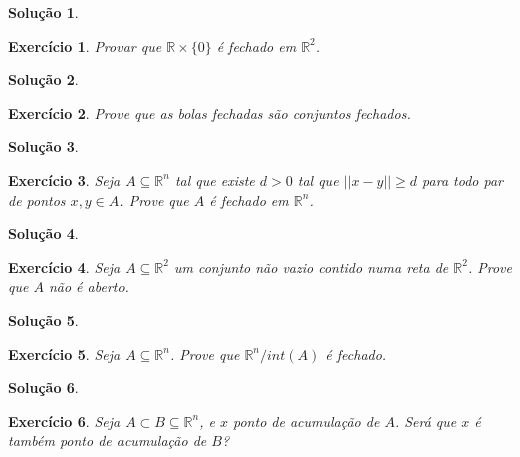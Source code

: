 \documentclass[a4paper,12pt]{article}
\newcommand{\R}{\mathbb{R}}
\theoremstyle{exer}
\newtheorem{exercise}{Exercício}
\theoremstyle{definition}
\newtheorem{solution}{Solução}
\theoremstyle{plain}
\begin{document}
\begin{solution}
 
\end{solution}

\begin{exercise}
    Provar que $\R \times \{0\}$ é fechado em $\R^2$.
\end{exercise}

\begin{solution}

\end{solution}

\begin{exercise}
    Prove que as bolas fechadas são conjuntos fechados.
\end{exercise}

\begin{solution}

\end{solution}

\begin{exercise}
    Seja $A \subseteq \R^n$ tal que existe $d > 0$ tal que $||x - y|| \ge d$
    para todo par de pontos $x, y \in A$. Prove que $A$ é fechado em $\R^n$.
\end{exercise}

\begin{solution}
  
\end{solution}

\begin{exercise}
    Seja $A \subseteq \R^2$ um conjunto não vazio contido numa reta de $\R^2$. Prove que $A$ não é
    aberto.
\end{exercise}

\begin{solution}

\end{solution}

\begin{exercise}
    Seja $A \subseteq \R^n$. Prove que $\R^n/int(A)$ é fechado.
\end{exercise}

\begin{solution}

\end{solution}

\begin{exercise}
    Seja $A \subset B \subseteq \R^n$, e $x$ ponto de acumulação de $A$. Será que $x$ é também ponto de
    acumulação de $B$?
\end{exercise}
\end{document}
